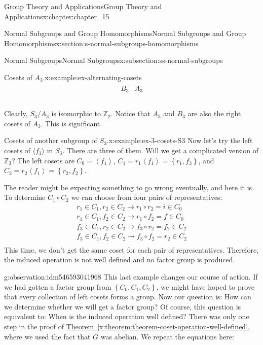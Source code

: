 \documentclass[oneside,10pt,]{book}
\newcommand{\xreffont}{\relax}
\numberwithin{equation}{section}
\begin{document}
\begin{chapterptx}{Group Theory and Applications}{}{Group Theory and Applications}{}{}{x:chapter:chapter_15}
\begin{sectionptx}{Normal Subgroups and Group Homomorphisms}{}{Normal Subgroups and Group Homomorphisms}{}{}{x:section:s-normal-subgroups-homomorphisms}
\begin{subsectionptx}{Normal Subgroups}{}{Normal Subgroups}{}{}{x:subsection:ss-normal-subgroups}
\begin{example}{Cosets of \(A_3\).}{x:example:ex-alternating-cosets}
\begin{equation*}
\begin{array}{c|c}
\begin{array}{cc}
B_3 & A_3 \\
\end{array}
\\
\end{array}
\end{equation*}
%
\par
Clearly, \(S_3/A_3\) is isomorphic to \(\mathbb{Z}_2\).   Notice that \(A_3\) and \(B_3\) are also the right cosets of \(A_3\).  This is significant.%
\end{example}
\begin{example}{Cosets of another subgroup of \(S_3\).}{x:example:ex-3-cosets-S3}%
Now let's try the left cosets of \(\langle f_1 \rangle\) in \(S_3\). There are three of them. Will we get a complicated version of \(\mathbb{Z}_3\)? The left cosets are \(C_0=\left\langle f_1\right\rangle\), \(C_1= r_1\left\langle f_1\right\rangle = \left\{r_1,f_3\right\}\),  and \(C_2= r_2\left\langle
f_1\right\rangle = \left\{r_2,f_2\right\}\).%
\par
The reader might be expecting something to go wrong eventually, and here it is. To determine \(C_1\circ C_2\) we can choose from four pairs of representatives:%
\begin{equation*}
\begin{array}{c}
r_1 \in C_1, r_2\in C_2    \longrightarrow  r_1\circ r_2=i\in C_0\\
r_1\in C_1, f_2\in C_2    \longrightarrow  r_1\circ f_2=f\in C_0\\
f_3\in C_1, r_2\in C_2    \longrightarrow  f_3\circ r_2=f_2\in C_2\\
f_3\in C_1, f_2\in C_2    \longrightarrow  f_3\circ f_2=r_2\in C_2\\
\end{array}
\end{equation*}
This time, we don't get the same coset for each pair of representatives. Therefore, the induced operation is not well defined and no factor group is produced.%
\end{example}
\begin{observation}{}{g:observation:idm546593041968}%
This last example changes our course of action. If we had gotten a factor group from \(\left\{C_0,C_1,C_2\right\}\), we might have hoped to prove that every collection of left cosets forms a group. Now our question is: How can we determine whether we will get a factor group? Of course, this question is equivalent to: When is the induced operation well defined? There was only one step in the proof of \hyperref[x:theorem:theorem-coset-operation-well-defined]{Theorem~{\xreffont\ref{x:theorem:theorem-coset-operation-well-defined}}}, where we used the fact that \(G\) was abelian. We repeat the equations here:%

\end{observation}
\end{subsectionptx}
\end{sectionptx}
\end{chapterptx}
\end{document}
